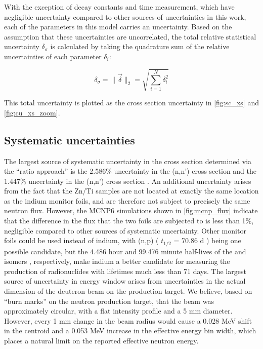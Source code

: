 \documentclass[5p]{elsarticle}
\newcommand{\norm}[1]{\lVert #1 \rVert}
\begin{document}
With the exception of decay constants  and time measurement, which have negligible uncertainty compared to other sources of uncertainties in this work, each of the parameters in this model carries an uncertainty.
Based on the assumption that these uncertainties are uncorrelated, the total relative statistical uncertainty $\delta_\sigma$ is calculated by taking the quadrature sum of the relative uncertainties of each parameter  $\delta_i$:

\begin{equation}
\delta_\sigma = \norm{ \ensuremath{\vec{\delta}} }_2 = \sqrt{\sum_{i=1}^N  \delta_i^2  }
\end{equation}

This total  uncertainty is plotted as the cross section uncertainty in \autoref{fig:sc_xs} and \autoref{fig:cu_xs_zoom}.



\subsection{Systematic uncertainties}

The largest source of systematic uncertainty in the cross section determined via the \enquote{ratio approach} is the 2.586\% uncertainty in the (n,n')  cross section and the 1.447\% uncertainty in the (n,n')  cross section  \cite{Capote2012,zsolnay2012technical}.
 An additional uncertainty arises from the fact that the Zn/Ti samples are not located at exactly the same location as the indium monitor foils, and are therefore not subject to precisely the same neutron flux.
 However, the MCNP6 simulations shown in \autoref{fig:mcnp_flux} indicate that the difference in the flux that the two foils are subjected to is less than 1\%, negligible compared to other sources of systematic uncertainty.
 Other monitor foils could be used instead of indium, with (n,p) ( $t_{1/2}$ = 70.86 d \cite{Nesaraja2010}) being one possible candidate, but the 4.486 hour and 99.476 minute half-lives of the  and  isomers \cite{Blachot2012,Blachot2010a}, respectively, make indium a better candidate for measuring the production of radionuclides with lifetimes much less than 71 days.
The largest source of uncertainty in energy window arises from uncertainties in the actual dimension of the deuteron beam on the production target.
 We believe, based on \enquote{burn marks} on the neutron production target, that the beam was approximately circular, with a flat intensity profile and a 5 mm diameter.
 However, every 1 mm change in the beam radius would cause a 0.028 MeV shift in the centroid and a 0.053 MeV increase in the effective energy bin width, which places a natural limit on the reported effective neutron energy.
 
\end{document}
